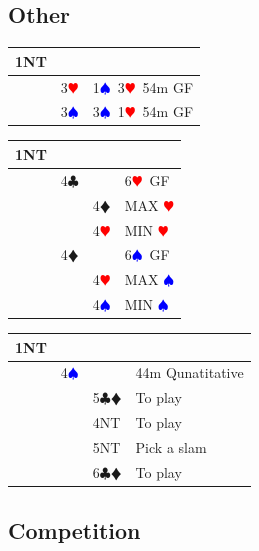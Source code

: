 \documentclass[a4paper]{article}
\newcommand{\BC}{\textcolor{OliveGreen}{$\clubsuit$}}
\newcommand{\BD}{\textcolor{RedOrange}{$\vardiamondsuit$}}
\newcommand{\BH}{\textcolor{Red}{$\varheartsuit${}}}
\newcommand{\BS}{\textcolor{Blue}{$\spadesuit${}}}
\begin{document}
\subsection{Other}

\begingroup
\renewcommand{\arraystretch}{1.4}
\begin{xltabular}{\linewidth}{|l|l|X|}
\hline
1NT &  &  \\
\hline
 & 3\BH & 1\BS\ 3\BH\ 54m GF \\
\hline
 & 3\BS & 3\BS\ 1\BH\ 54m GF \\
\hline
\end{xltabular}
\endgroup
\bigbreak
\begingroup
\renewcommand{\arraystretch}{1.4}
\begin{xltabular}{\linewidth}{|l|l|l|X|}
\hline
1NT &  &  &  \\
\hline
 & 4\BC &  & 6\BH\ GF \\
\hline
 &  & 4\BD & MAX \BH \\
\hline
 &  & 4\BH & MIN \BH \\
\hline
 & 4\BD &  & 6\BS\ GF \\
\hline
 &  & 4\BH & MAX \BS \\
\hline
 &  & 4\BS & MIN \BS \\
\hline
\end{xltabular}
\endgroup
\bigbreak
\begingroup
\renewcommand{\arraystretch}{1.4}
\begin{xltabular}{\linewidth}{|l|l|l|X|}
\hline
1NT &  &  &  \\
\hline
 & 4\BS &  & 44m Qunatitative \\
\hline
 &  & 5\BC\BD & To play \\
\hline
 &  & 4NT & To play \\
\hline
 &  & 5NT & Pick a slam \\
\hline
 &  & 6\BC\BD & To play \\
\hline
\end{xltabular}
\endgroup
\bigbreak
\subsection{Competition}
\end{document}
